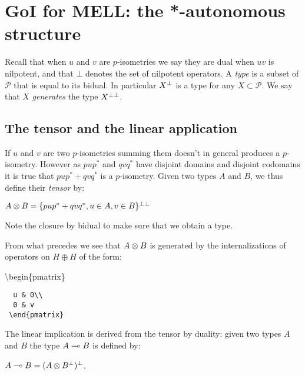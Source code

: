 \section{GoI for MELL: the *-autonomous structure}\label{goi-for-mell-the--autonomous-structure}

Recall that when \(u\) and \(v\) are \(p\)-isometries we say they are
dual when \(uv\) is nilpotent, and that \(\bot\) denotes the set of
nilpotent operators. A \emph{type} is a subset of \(\mathcal{P}\) that
is equal to its bidual. In particular \(X^\bot\) is a type for any
\(X\subset\mathcal{P}\). We say that \(X\) \emph{generates} the type
\(X^{\bot\bot}\).

\subsection{The tensor and the linear application}\label{the-tensor-and-the-linear-application}

If \(u\) and \(v\) are two \(p\)-isometries summing them doesn't in
general produces a \(p\)-isometry. However as \(pup^*\) and \(qvq^*\)
have disjoint domains and disjoint codomains it is true that
\(pup^* + qvq^*\) is a \(p\)-isometry. Given two types \(A\) and \(B\),
we thus define their \emph{tensor} by:

\begin{description}
\tightlist
\item[]
\(A\otimes B = \{pup^* + qvq^*, u\in A, v\in B\}^{\bot\bot}\)
\end{description}

Note the closure by bidual to make sure that we obtain a type.

From what precedes we see that \(A\otimes B\) is generated by the
internalizations of operators on \(H\oplus H\) of the form:

\begin{description}
\tightlist
\item[]
\textbackslash{}begin\{pmatrix\}
\end{description}

\texttt{~~u~\&~0\textbackslash{}\textbackslash{}}\\
\texttt{~~0~\&~v}\\
\texttt{~\textbackslash{}end\{pmatrix\}}

The linear implication is derived from the tensor by duality: given two
types \(A\) and \(B\) the type \(A\multimap B\) is defined by:

\begin{description}
\tightlist
\item[]
\(A\multimap B = (A\otimes B^\bot)^\bot\).
\end{description}

